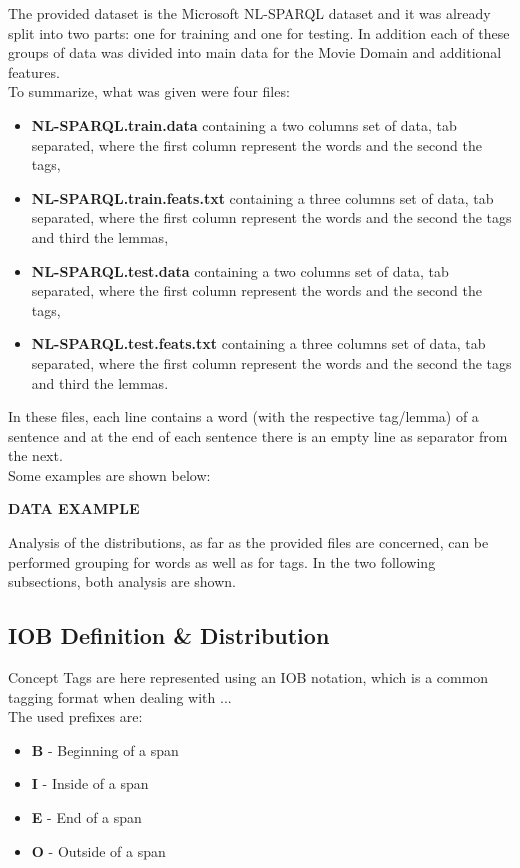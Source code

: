 \documentclass[11pt,a4paper]{article}
\begin{document}
The provided dataset is the Microsoft NL-SPARQL dataset and it was already split into two parts: one for training and one for testing. In addition each of these groups of data was divided into main data for the Movie Domain and additional features.\\ 
To summarize, what was given were four files:
\begin{itemize}
	\item \textbf{NL-SPARQL.train.data} containing a two columns set of data, tab separated, where the first column represent the words and the second the tags,
	\item \textbf{NL-SPARQL.train.feats.txt} containing a three columns set of data, tab separated, where the first column represent the words and the second the tags and third the lemmas,
	\item \textbf{NL-SPARQL.test.data} containing a two columns set of data, tab separated, where the first column represent the words and the second the tags,
	\item \textbf{NL-SPARQL.test.feats.txt} containing a three columns set of data, tab separated, where the first column represent the words and the second the tags and third the lemmas.
\end{itemize}

In these files, each line contains a word (with the respective tag/lemma) of a sentence and at the end of each sentence there is an empty line as separator from the next.\\
Some examples are shown below:

\large\textbf{DATA EXAMPLE}

Analysis of the distributions, as far as the provided files are concerned, can be performed grouping for words as well as for tags. In the two following subsections, both analysis are shown.

\subsection{IOB Definition \& Distribution}
 
 Concept Tags are here represented using an IOB notation, which is a common tagging format when dealing with ...\\
 The used prefixes are:
 \begin{itemize}
 	\item \textbf{B} - Beginning of a span
 	\item \textbf{I} - Inside of a span
 	\item \textbf{E} - End of a span
 	\item \textbf{O} - Outside of a span
 \end{itemize}
 
\end{document}
